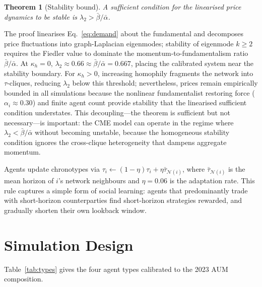 \documentclass[preprint,12pt,authoryear]{elsarticle}
\newtheorem{theorem}{Theorem}
\begin{document}
\begin{theorem}[Stability bound]
A sufficient condition for the linearised price dynamics to be stable
is $\lambda_2 > \bar{\beta}/\bar{\alpha}$.
\end{theorem}

The proof linearises Eq.~\eqref{eq:demand} about the fundamental and
decomposes price fluctuations into graph-Laplacian eigenmodes; stability
of eigenmode $k \geq 2$ requires the Fiedler value to dominate the
momentum-to-fundamentalism ratio $\bar{\beta}/\bar{\alpha}$.
At $\kappa_h = 0$, $\lambda_2 \approx 0.66 \approx \bar{\beta}/\bar{\alpha}
= 0.667$, placing the calibrated system near the stability boundary.
For $\kappa_h > 0$, increasing homophily fragments the network into
$\tau$-cliques, reducing $\lambda_2$ below this threshold; nevertheless,
prices remain empirically bounded in all simulations because the nonlinear
fundamentalist restoring force ($\alpha_i \approx 0.30$) and finite agent
count provide stability that the linearised sufficient condition understates.
This decoupling---the theorem is sufficient but not necessary---is important:
the CME model can operate in the regime where $\lambda_2 < \bar{\beta}/\bar{\alpha}$
without becoming unstable, because the homogeneous stability condition
ignores the cross-clique heterogeneity that dampens aggregate momentum.

Agents update chronotypes via
$\tau_i \leftarrow (1-\eta)\tau_i + \eta\bar{\tau}_{\mathcal{N}(i)}$,
where $\bar{\tau}_{\mathcal{N}(i)}$ is the mean horizon of $i$'s network
neighbours and $\eta = 0.06$ is the adaptation rate.
This rule captures a simple form of social learning: agents that
predominantly trade with short-horizon counterparties find short-horizon
strategies rewarded, and gradually shorten their own lookback window.

\section{Simulation Design}
\label{sec:sim}

Table~\ref{tab:types} gives the four agent types calibrated to the 2023
AUM composition.

\begin{table}[h]
\centering
\caption{Investor types in the CME simulation.
$\tau$ is drawn from a log-normal $\mathrm{LN}(\mu,\sigma)$
on the log scale (trading days).}
\label{tab:types}
\end{table}
\end{document}
